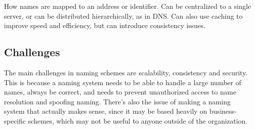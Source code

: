 How names are mapped to an address or identifier. Can be centralized to a single server, or can be distributed hierarchically, as in DNS. Can also use caching to improve speed and efficiency, but can introduce consistency issues.

\subsection*{Challenges}

The main challenges in naming schemes are scalability, consistency and security. This is because a naming system needs to be able to handle a large number of names, always be correct, and needs to prevent unauthorized access to name resolution and spoofing naming. There's also the issue of making a naming system that actually makes sense, since it may be based heavily on business-specific schemes, which may not be useful to anyone outside of the organization.